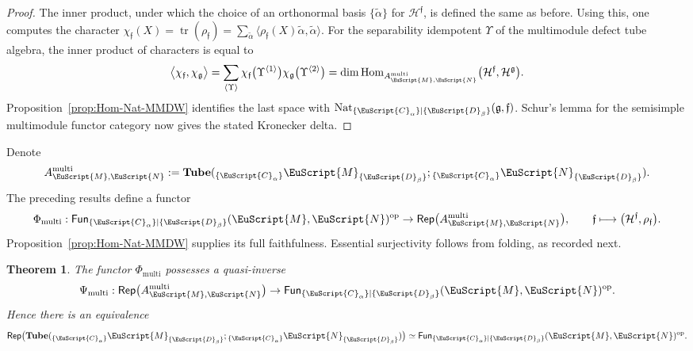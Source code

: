 \documentclass[a4paper,11pt]{article}
\newtheorem{theorem}{Theorem}[section]
\theoremstyle{definition}
\theoremstyle{remark}
\newcommand\eC           {\EuScript{C}}
\newcommand\eD           {\EuScript{D}}
\newcommand\eM          {\EuScript{M}}
\newcommand\eN         {\EuScript{N}}
\newcommand{\Rep}{\mathsf{Rep}}
\newcommand{\Hom}{\operatorname{Hom}}
\newcommand{\Tube}{\mathbf{Tube}}
\newcommand{\Fun}{\mathsf{Fun}}
\begin{document}
\begin{proof}
    The inner product, under which the choice of an orthonormal basis $\{\tilde{\alpha}\}$ for $\mathcal{H}^{\mathfrak{f}}$, is defined the same as before. Using this, one computes the character $\chi_\mathfrak{f}(X) = \operatorname{tr}(\rho_{\mathfrak{f}}) = \sum_{\tilde{\alpha}}\langle \rho_{\mathfrak{f}}(X)\tilde{\alpha},\tilde{\alpha}\rangle$. 
    For the separability idempotent $\Upsilon$ of the multimodule defect tube algebra, the inner product of characters is equal to 
    \begin{equation}
        \bigl\langle \chi_{\mathfrak f},\chi_{\mathfrak g}\bigr\rangle = \sum_{\langle\Upsilon\rangle} \chi_{\mathfrak f} \bigl(\Upsilon^{\langle1\rangle}\bigr)\chi_{\mathfrak g}
        \bigl(\Upsilon^{\langle2\rangle}\bigr) = \dim
        \Hom_{A^{\mathrm{multi}}_{\eM,\eN}} \bigl(\mathcal H^{\mathfrak f}, \mathcal H^{\mathfrak g} \bigr).
    \end{equation}
    Proposition~\ref{prop:Hom-Nat-MMDW} identifies the last space with $\operatorname{Nat}_{\{\eC_\alpha\}|\{\eD_\beta\}} (\mathfrak g,\mathfrak f)$.  Schur's lemma for the semisimple multimodule functor category now gives the stated Kronecker
    delta.
\end{proof}

Denote 
\[
    A^{\rm multi}_{\eM,\eN} := \mathbf{Tube}({_{\{\eC_{\alpha}\}}} \eM_{\{\eD_{\beta}\}};{_{\{\eC_{\alpha}\}}} \eN_{\{\eD_{\beta}\}}). 
\]
The preceding results define a functor
\begin{equation}
    \Phi_{\mathrm{multi}}:
    \Fun_{\{\eC_\alpha\}|\{\eD_\beta\}}(\eM,\eN)^{\rm op}
    \to 
    \Rep\bigl(A_{\eM,\eN}^{\mathrm{multi}}\bigr),
    \qquad
    \mathfrak f
    \longmapsto
    \bigl(
        \mathcal H^{\mathfrak f},
        \rho_{\mathfrak f}
    \bigr).
    \label{eq:multimodule-disk-functor}
\end{equation}
Proposition~\ref{prop:Hom-Nat-MMDW} supplies its full faithfulness.  Essential surjectivity follows from folding, as recorded next.

\begin{theorem}
    \label{thm:Fun-Rep-equiv-MMDW}
    The functor $\Phi_{\mathrm{multi}}$ possesses a
    quasi-inverse
    \begin{equation}
        \Psi_{\mathrm{multi}}:
        \Rep\bigl(A_{\eM,\eN}^{\mathrm{multi}}\bigr)
        \to 
        \Fun_{\{\eC_\alpha\}|\{\eD_\beta\}}(\eM,\eN)^{\rm op}.
    \end{equation}
    Hence there is an equivalence 
    \begin{equation}
        \Rep\bigl(\Tube({}_{\{\eC_\alpha\}}\eM_{\{\eD_\beta\}};{}_{\{\eC_\alpha\}}\eN_{\{\eD_\beta\}})\bigr) \simeq \Fun_{\{\eC_\alpha\}|\{\eD_\beta\}}(\eM,\eN)^{\rm op}.
        \label{eq:multimodule-representation-equivalence}
    \end{equation}
\end{theorem}
\end{document}
